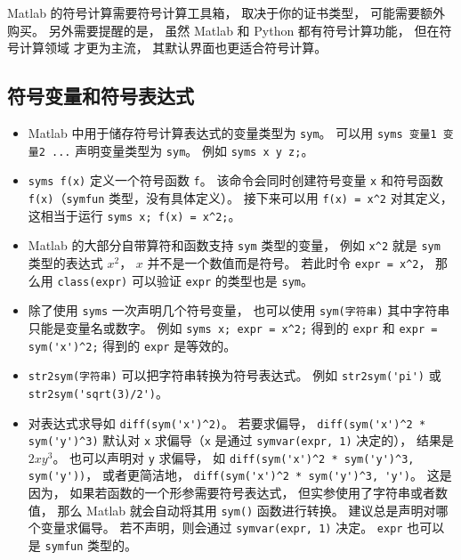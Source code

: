 

Matlab 的符号计算需要符号计算工具箱， 取决于你的证书类型， 可能需要额外购买。 另外需要提醒的是， 虽然 Matlab 和 Python 都有符号计算功能， 但在符号计算领域  才更为主流， 其默认界面也更适合符号计算。

\subsection{符号变量和符号表达式}
\begin{itemize}
\item Matlab 中用于储存符号计算表达式的变量类型为 \verb`sym`。 可以用 \verb`syms 变量1 变量2 ...` 声明变量类型为 \verb`sym`。 例如 \verb`syms x y z;`。

\item \verb`syms f(x)` 定义一个符号函数 \verb`f`。 该命令会同时创建符号变量 \verb`x` 和符号函数 \verb`f(x)`（\verb`symfun` 类型，没有具体定义）。 接下来可以用 \verb`f(x) = x^2` 对其定义， 这相当于运行 \verb`syms x; f(x) = x^2;`。

\item Matlab 的大部分自带算符和函数支持 \verb`sym` 类型的变量， 例如 \verb`x^2` 就是 \verb`sym` 类型的表达式 $x^2$， $x$ 并不是一个数值而是符号。 若此时令 \verb`expr = x^2`， 那么用 \verb`class(expr)` 可以验证 \verb`expr` 的类型也是 \verb`sym`。

\item 除了使用 \verb`syms` 一次声明几个符号变量， 也可以使用 \verb`sym(字符串)` 其中字符串只能是变量名或数字。 例如 \verb`syms x; expr = x^2;` 得到的 \verb`expr` 和 \verb`expr = sym('x')^2;` 得到的 \verb`expr` 是等效的。

\item \verb`str2sym(字符串)` 可以把字符串转换为符号表达式。 例如 \verb`str2sym('pi')` 或 \verb`str2sym('sqrt(3)/2')`。

\item  对表达式求导如 \verb`diff(sym('x')^2)`。 若要求偏导， \verb`diff(sym('x')^2 * sym('y')^3)` 默认对 \verb`x` 求偏导（\verb`x` 是通过 \verb`symvar(expr, 1)` 决定的）， 结果是 $2x y^3$。 也可以声明对 \verb`y` 求偏导， 如 \verb`diff(sym('x')^2 * sym('y')^3, sym('y'))`， 或者更简洁地， \verb`diff(sym('x')^2 * sym('y')^3, 'y')`。 这是因为， 如果若函数的一个形参需要符号表达式， 但实参使用了字符串或者数值， 那么 Matlab 就会自动将其用 \verb`sym()` 函数进行转换。 建议总是声明对哪个变量求偏导。 若不声明，则会通过 \verb`symvar(expr, 1)` 决定。 \verb`expr` 也可以是 \verb`symfun` 类型的。


\end{itemize}
